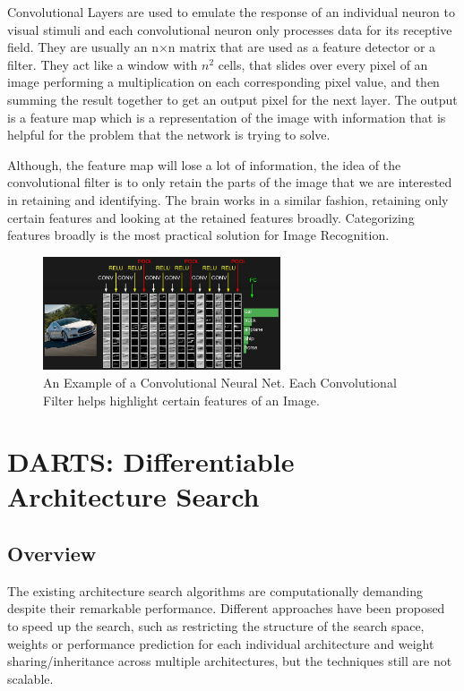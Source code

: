 \documentclass{ieee}
\begin{document}
Convolutional Layers are used to emulate the response of an individual neuron to visual stimuli and each convolutional neuron only processes data for its receptive field. They are usually an n$\times$n matrix that are used as a feature detector or a filter. They act like a window with $n^2$ cells, that slides over every pixel of an image  performing a multiplication on each corresponding pixel value, and then summing the result together to get an output pixel for the next layer. The output is a feature map which is a representation of the image with information that is helpful for the problem that the network is trying to solve.

Although, the feature map will lose a lot of information, the idea of the convolutional filter is to only retain the parts of the image that we are interested in retaining and identifying.
 The brain works in a similar fashion, retaining only certain features and looking at the retained features broadly. Categorizing features broadly is the most practical solution for Image Recognition.
 \begin{figure}[h]
    \begin{center}
    \includegraphics[width=7cm]{images/convnet.jpeg}
    \end{center}
    \label{mbconv_fig}
    \caption{An Example of a Convolutional Neural Net. Each Convolutional Filter helps highlight certain features of an Image. \cite{CONVNETIMAGE}}
\end{figure}

\section{DARTS: Differentiable Architecture Search}
\subsection{Overview}
The existing architecture search algorithms are computationally demanding despite their remarkable performance. Different approaches have been proposed to speed up the search, such as restricting the structure of the search space, weights or performance prediction for each individual architecture and weight sharing/inheritance across multiple architectures, but the techniques still are not scalable. 
\end{document}

